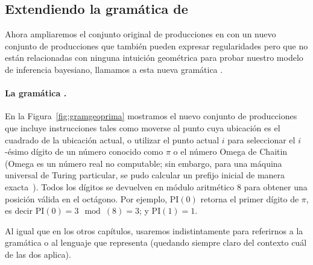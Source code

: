 \subsection{Extendiendo la gramática de \gramgeo}


Ahora ampliaremos el conjunto original de producciones en \gramgeo con un nuevo conjunto de producciones que también pueden expresar regularidades pero que no están relacionadas con ninguna intuición geométrica para probar nuestro modelo de inferencia bayesiano, llamamos a esta nueva gramática \gramgeoprima.


\paragraph{La gramática \gramgeoprima.}

En la Figura~\ref{fig:gramgeoprima} mostramos el nuevo conjunto de producciones que incluye instrucciones tales como moverse al punto cuya ubicación es el cuadrado de la ubicación actual, o utilizar el punto actual $i$ para seleccionar el $i$-ésimo dígito de un número conocido como $\pi$ o el número Omega de Chaitin (Omega es un número real no computable; sin embargo, para una máquina universal de Turing particular, se pudo calcular un prefijo inicial de manera exacta~\cite{calude2002computing}). Todos los dígitos se devuelven en módulo aritmético 8 para obtener una posición válida en el octágono. Por ejemplo, $\textrm{PI}(0)$ retorna el primer dígito de $\pi$, es decir $\textrm{PI}(0)= 3 \mod({8}) = 3$; y $\textrm{PI}(1) = 1$.


Al igual que en los otros capítulos, usaremos indistintamente \gramgeoprima para referirnos a la gramática o al lenguaje que representa (quedando siempre claro del contexto cuál de las dos aplica).


